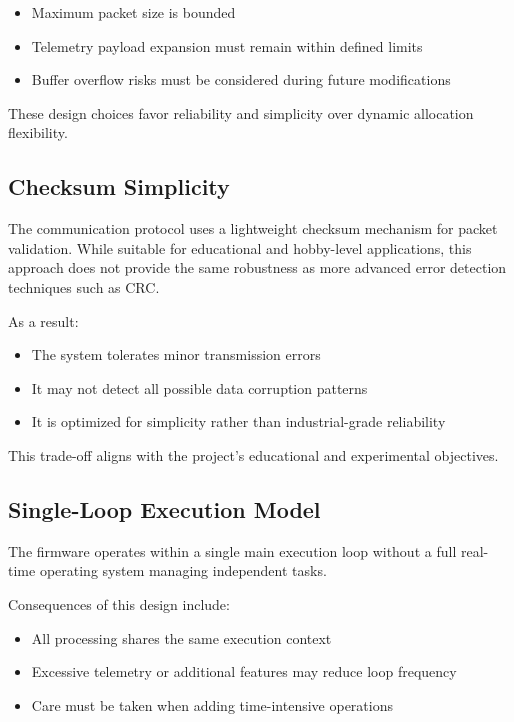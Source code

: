 \begin{itemize}
	\item Maximum packet size is bounded
	\item Telemetry payload expansion must remain within defined limits
	\item Buffer overflow risks must be considered during future modifications
\end{itemize}

These design choices favor reliability and simplicity over dynamic allocation flexibility.

\subsection{Checksum Simplicity}

The communication protocol uses a lightweight checksum mechanism for packet validation. While suitable for educational and hobby-level applications, this approach does not provide the same robustness as more advanced error detection techniques such as CRC.

As a result:

\begin{itemize}
	\item The system tolerates minor transmission errors
	\item It may not detect all possible data corruption patterns
	\item It is optimized for simplicity rather than industrial-grade reliability
\end{itemize}

This trade-off aligns with the project's educational and experimental objectives.

\subsection{Single-Loop Execution Model}

The firmware operates within a single main execution loop without a full real-time operating system managing independent tasks.

Consequences of this design include:

\begin{itemize}
	\item All processing shares the same execution context
	\item Excessive telemetry or additional features may reduce loop frequency
	\item Care must be taken when adding time-intensive operations
\end{itemize}

